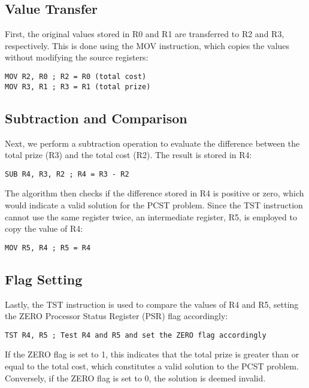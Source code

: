\subsection{Value Transfer}

First, the original values stored in R0 and R1 are transferred to R2 and R3, respectively. This is done using the MOV instruction, which copies the values without modifying the source registers:

\begin{verbatim}
MOV R2, R0 ; R2 = R0 (total cost)
MOV R3, R1 ; R3 = R1 (total prize)
\end{verbatim}

\subsection{Subtraction and Comparison}

Next, we perform a subtraction operation to evaluate the difference between the total prize (R3) and the total cost (R2). The result is stored in R4:

\begin{verbatim}
SUB R4, R3, R2 ; R4 = R3 - R2
\end{verbatim}

The algorithm then checks if the difference stored in R4 is positive or zero, which would indicate a valid solution for the PCST problem. Since the TST instruction cannot use the same register twice, an intermediate register, R5, is employed to copy the value of R4:

\begin{verbatim}
MOV R5, R4 ; R5 = R4
\end{verbatim}

\subsection{Flag Setting}

Lastly, the TST instruction is used to compare the values of R4 and R5, setting the ZERO Processor Status Register (PSR) flag accordingly:

\begin{verbatim}
TST R4, R5 ; Test R4 and R5 and set the ZERO flag accordingly
\end{verbatim}

If the ZERO flag is set to 1, this indicates that the total prize is greater than or equal to the total cost, which constitutes a valid solution to the PCST problem. Conversely, if the ZERO flag is set to 0, the solution is deemed invalid.

